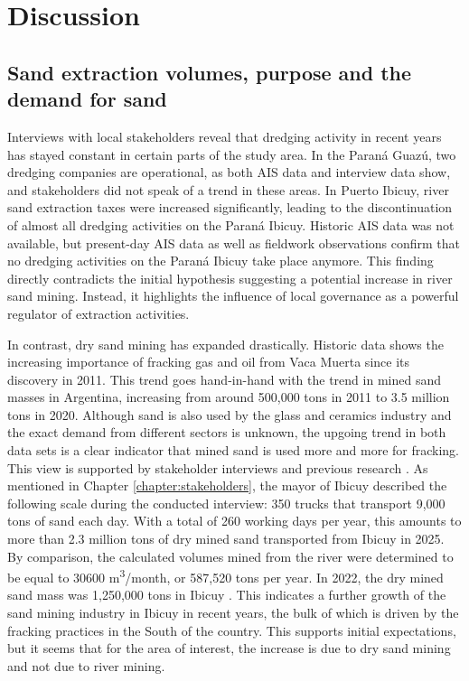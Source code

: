 \chapter{Discussion}

\section{Sand extraction volumes, purpose and the demand for sand}
Interviews with local stakeholders reveal that dredging activity in recent years has stayed constant in certain parts of the study area. In the Paraná Guazú, two dredging companies are operational, as both AIS data and interview data show, and stakeholders did not speak of a trend in these areas. In Puerto Ibicuy, river sand extraction taxes were increased significantly, leading to the discontinuation of almost all dredging activities on the Paraná Ibicuy. Historic AIS data was not available, but present-day AIS data as well as fieldwork observations confirm that no dredging activities on the Paraná Ibicuy take place anymore. This finding directly contradicts the initial hypothesis suggesting a potential increase in river sand mining. Instead, it highlights the influence of local governance as a powerful regulator of extraction activities.

In contrast, dry sand mining has expanded drastically. Historic data shows the increasing importance of fracking gas and oil from Vaca Muerta since its discovery in 2011. This trend goes hand-in-hand with the trend in mined sand masses in Argentina, increasing from around 500,000 tons in 2011 to 3.5 million tons in 2020. Although sand is also used by the glass and ceramics industry and the exact demand from different sectors is unknown, the upgoing trend in both data sets is a clear indicator that mined sand is used more and more for fracking. This view is supported by stakeholder interviews and previous research \autocite{fogliaSedArena2023} \autocite{secretariadepoliticamineraArenasParaFracking2019}. As mentioned in Chapter \ref{chapter:stakeholders}, the mayor of Ibicuy described the following scale during the conducted interview: 350 trucks that transport 9,000 tons of sand each day. With a total of 260 working days per year, this amounts to more than 2.3 million tons of dry mined sand transported from Ibicuy in 2025. By comparison, the calculated volumes mined from the river were determined to be equal to 30600 m\textsuperscript{3}/month, or 587,520 tons per year. In 2022, the dry mined sand mass was 1,250,000 tons in Ibicuy \autocite{fogliaSedArena2023}. This indicates a further growth of the sand mining industry in Ibicuy in recent years, the bulk of which is driven by the fracking practices in the South of the country. This supports initial expectations, but it seems that for the area of interest, the increase is due to dry sand mining and not due to river mining.

